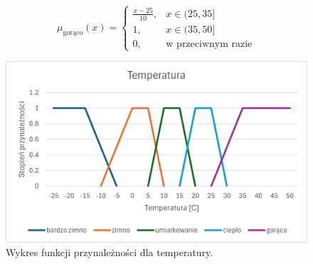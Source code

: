 \documentclass{article}
\begin{document}
\begin{enumerate}
                \begin{equation}
                    \mu_{\text{gorąco}}(x) =
                    \begin{cases}
                    \frac{x - 25}{10}, & x \in (25, 35] \\
                    1, & x \in (35, 50] \\
                    0, & \text{w przeciwnym razie}
                    \end{cases}
                \end{equation}

        \begin{figure}[H]
    \centering
    \includegraphics[width=\textwidth]{img/temp.png}
    \caption{Wykres funkcji przynależności dla temperatury.}
    \end{figure}


\end{enumerate}
\end{document}
